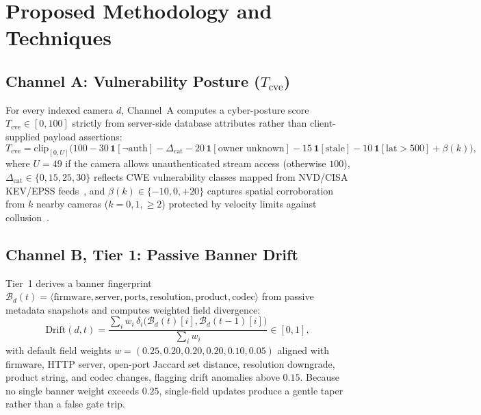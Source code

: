 \section{Proposed Methodology and Techniques}

\subsection{Channel A: Vulnerability Posture ($T_{\mathrm{cve}}$)}
For every indexed camera $d$, Channel~A computes a cyber-posture score $T_{\mathrm{cve}} \in [0, 100]$ strictly from server-side database attributes rather than client-supplied payload assertions:
\begin{equation}
  T_{\mathrm{cve}} = \mathrm{clip}_{[0, U]}\!\Big(100 - 30\,\mathbf{1}[\neg \mathrm{auth}] - \Delta_{\mathrm{cat}} - 20\,\mathbf{1}[\text{owner unknown}] - 15\,\mathbf{1}[\mathrm{stale}] - 10\,\mathbf{1}[\mathrm{lat} > 500] + \beta(k)\Big),
\end{equation}
where $U = 49$ if the camera allows unauthenticated stream access (otherwise $100$), $\Delta_{\mathrm{cat}} \in \{0, 15, 25, 30\}$ reflects CWE vulnerability classes mapped from NVD/CISA KEV/EPSS feeds~\cite{nvd,cisakev,jacobs2021epss}, and $\beta(k) \in \{-10, 0, +20\}$ captures spatial corroboration from $k$ nearby cameras ($k = 0, 1, \ge 2$) protected by velocity limits against collusion~\cite{kipf2017gcn}.

\subsection{Channel B, Tier 1: Passive Banner Drift}
Tier~1 derives a banner fingerprint $\mathcal{B}_d(t) = \langle \mathrm{firmware}, \mathrm{server}, \mathrm{ports}, \mathrm{resolution}, \mathrm{product}, \mathrm{codec}\rangle$ from passive metadata snapshots and computes weighted field divergence:
\begin{equation}
  \mathrm{Drift}(d, t) = \frac{\sum_{i} w_i\,\delta_i\big(\mathcal{B}_d(t)[i], \mathcal{B}_d(t-1)[i]\big)}{\sum_i w_i} \in [0, 1],
\end{equation}
with default field weights $w = (0.25, 0.20, 0.20, 0.20, 0.10, 0.05)$ aligned with firmware, HTTP server, open-port Jaccard set distance, resolution downgrade, product string, and codec changes, flagging drift anomalies above $0.15$. Because no single banner weight exceeds $0.25$, single-field updates produce a gentle taper rather than a false gate trip.


